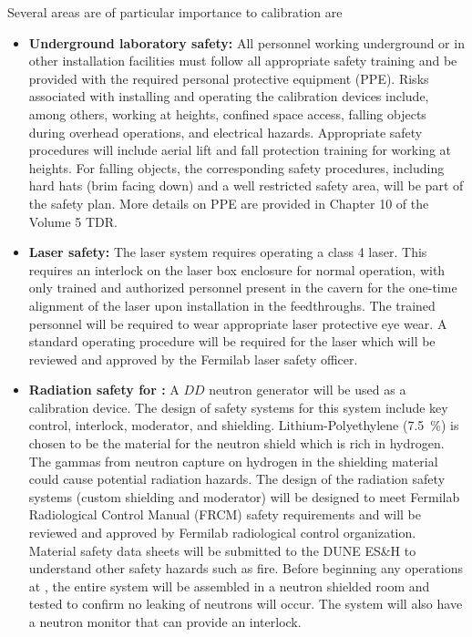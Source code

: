 Several areas are of particular importance to calibration are
\begin{itemize}
\item {\bf Underground laboratory safety:} All personnel working underground or in other installation facilities must follow all appropriate safety training and be provided with the required personal protective equipment (PPE). Risks associated with installing and operating the calibration devices include, among others, working at heights, confined space access, falling objects during overhead operations, and electrical hazards. Appropriate safety procedures will include aerial lift and fall protection training for working at heights. For falling objects, the corresponding safety procedures, including hard hats (brim facing down) and a well restricted safety area, will be part of the safety plan. More details on PPE are provided in Chapter 10 of the Volume 5 TDR.

\item {\bf Laser safety:} The laser system requires operating a class 4 laser\cite{FNAL:Class4Lasers,CERN:Class4Lasers}. This requires an interlock on the laser box enclosure for normal operation, with only trained and authorized personnel present in the cavern for the one-time alignment of the laser upon installation in the feedthroughs. The trained personnel will be required to wear appropriate laser protective eye wear. A standard operating procedure will be required for the laser which will be reviewed and approved by the Fermilab laser safety officer. 

\item {\bf Radiation safety for :} A $DD$ neutron generator will be used as a calibration device. The design of safety systems for this system include key control, interlock, moderator, and shielding. Lithium-Polyethylene (\SI{7.5}{\%}) is chosen to be the material for the neutron shield which is rich in hydrogen. The gammas from neutron capture on hydrogen in the shielding material could cause potential radiation hazards. The design of the radiation safety systems (custom shielding and moderator) will be designed to meet Fermilab Radiological Control Manual (FRCM) safety requirements and will be reviewed and approved by Fermilab radiological control organization. Material safety data sheets will be submitted to the DUNE ES\&H to understand other safety hazards such as fire. Before beginning any operations at , the entire system will be assembled in a neutron shielded room and tested to confirm no leaking of neutrons will occur. The system will also have a neutron monitor that can provide an interlock. 


\end{itemize}
